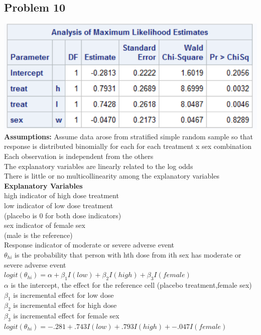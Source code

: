 \documentclass{article}
\begin{document}
\begin{flushleft}
\section*{Problem 10}
\includegraphics[scale=.6]{logit.png}\\
\textbf{Assumptions:}
Assume data arose from stratified simple random sample so that response is distributed binomially for each
for each treatment x sex combination\\
Each observation is independent from the others\\
The explanatory variables are linearly related to the log odds\\
There is little or no multicollinearity among the explanatory variables\\
\textbf{Explanatory Variables}\\
high indicator of high dose treatment\\
low indicator of low dose treatment\\
(placebo is 0 for both dose indicators)\\
sex indicator of female sex\\
(male is the reference)\\
Response indicator of moderate or severe adverse event\\
$\theta_{hi}$ is the probability that person with hth dose from ith sex has moderate or severe adverse event\\
$logit(\theta_{hi}) = \alpha + \beta_1 I(low) + \beta_2 I(high) + \beta_3 I(female)$\\
$\alpha$ is the intercept, the effect for the reference cell (placebo treatment,female sex)\\
$\beta_1$ is incremental effect for low dose\\
$\beta_2$ is incremental effect for high dose\\
$\beta_3$ is incremental effect for female sex\\
$logit(\theta_{hi}) = -.281 + .743I(low) + .793I(high) +-.047I(female)$\\

\end{flushleft}
\end{document}
